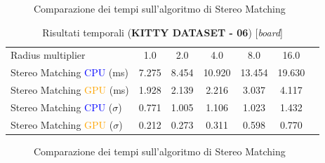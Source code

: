 \documentclass[12pt,a4paper]{report}
\begin{document}
\begin{figure}[H]
    \centering
    \caption{Comparazione dei tempi sull'algoritmo di Stereo Matching }
\end{figure}


\newpage
\begin{table}[H]
    \centering
    \caption{Risultati temporali (\textbf{KITTY DATASET - 06}) [\textit{board}] }
    \begin{tabular}{lcccccc}
        \toprule
        \rowcolor{gray!20}
        Radius multiplier & 1.0 & \cellcolor{orange!40}2.0 & 4.0 & 8.0 & 16.0 \\
        Stereo Matching \textcolor{blue}{CPU} (ms) & 7.275 & 8.454 & 10.920 & 13.454 & 19.630\\
        Stereo Matching \textcolor{orange}{GPU} (ms) & 1.928 & 2.139 & 2.216 & 3.037 & 4.117 \\
        Stereo Matching \textcolor{blue}{CPU} ($\sigma$) & 0.771 & 1.005 & 1.106 & 1.023 & 1.432\\
        Stereo Matching \textcolor{orange}{GPU} ($\sigma$) & 0.212 & 0.273 & 0.311 & 0.598 & 0.770 \\
        \bottomrule
    \end{tabular}
\end{table}

\begin{figure}[H]
    \centering
    \caption{Comparazione dei tempi sull'algoritmo di Stereo Matching }
\end{figure}
\end{document}
